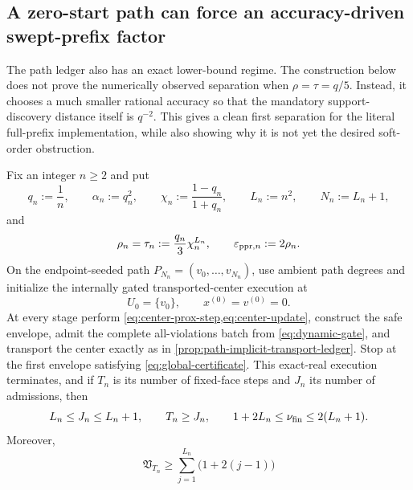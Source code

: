 \subsection{A zero-start path can force an accuracy-driven swept-prefix factor}
\label{sec:path-swept-separation}

The path ledger also has an exact lower-bound regime.  The construction below
does not prove the numerically observed separation when $\rho=\tau=q/5$.
Instead, it chooses a much smaller rational accuracy so that the mandatory
support-discovery distance itself is $q^{-2}$.  This gives a clean first
separation for the literal full-prefix implementation, while also showing why
it is not yet the desired soft-order obstruction.

\begin{proposition}
\label{prop:path-zero-start-swept-separation}
Fix an integer $n\geq2$ and put
\begin{equation}
 q_n:=\frac1n,
 \qquad \alpha_n:=q_n^2,
 \qquad \chi_n:=\frac{1-q_n}{1+q_n},
 \qquad L_n:=n^2,
 \qquad N_n:=L_n+1,
 \label{eq:path-swept-parameters-a}
\end{equation}
and
\begin{equation}
 \rho_n=\tau_n:=\frac{q_n}{3}\chi_n^{L_n},
 \qquad \varepsilon_{\mathrm{ppr},n}:=2\rho_n.
 \label{eq:path-swept-parameters-b}
\end{equation}
On the endpoint-seeded path
$P_{N_n}=(v_0,\ldots,v_{N_n})$, use ambient path degrees and initialize the
internally gated transported-center execution at
\begin{equation}
 U_0=\{v_0\},
 \qquad x^{(0)}=v^{(0)}=0.
 \label{eq:path-swept-zero-start}
\end{equation}
At every stage perform
\cref{eq:center-prox-step,eq:center-update}, construct the safe envelope, admit
the complete all-violations batch from \cref{eq:dynamic-gate}, and transport
the center exactly as in \cref{prop:path-implicit-transport-ledger}.  Stop at
the first envelope satisfying \cref{eq:global-certificate}.  This exact-real
execution terminates, and if $T_n$ is its number of fixed-face steps and $J_n$
its number of admissions, then
\begin{equation}
 L_n\leq J_n\leq L_n+1,
 \qquad T_n\geq J_n,
 \qquad
 1+2L_n\leq\nu_{\rm fin}\leq2(L_n+1).
 \label{eq:path-swept-stage-bounds}
\end{equation}
Moreover,
\begin{equation}
 \mathfrak V_{T_n}
 \geq\sum_{j=1}^{L_n}\bigl(1+2(j-1)\bigr)

\end{equation}
\end{proposition}
